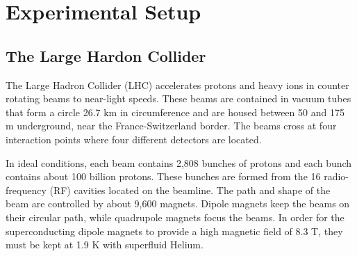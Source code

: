 \chapter{Experimental Setup}
\label{ch:ExpSetup}

\section{The Large Hardon Collider}
The Large Hadron Collider (LHC) accelerates protons and heavy ions in counter rotating beams to near-light speeds. These beams are contained in vacuum tubes that form a circle 26.7 km in circumference and are housed between 50 and 175 m underground, near the France-Switzerland border. The beams cross at four interaction points where four different detectors are located. 

In ideal conditions, each beam contains 2,808 bunches of protons and each bunch contains about 100 billion protons. These bunches are formed from the 16 radio-frequency (RF) cavities located on the beamline. The path and shape of the beam are controlled by about 9,600 magnets. Dipole magnets keep the beams on their circular path, while quadrupole magnets focus the beams. In order for the superconducting dipole magnets to provide a high magnetic field of 8.3 T, they must be kept at 1.9 K with superfluid Helium. 


